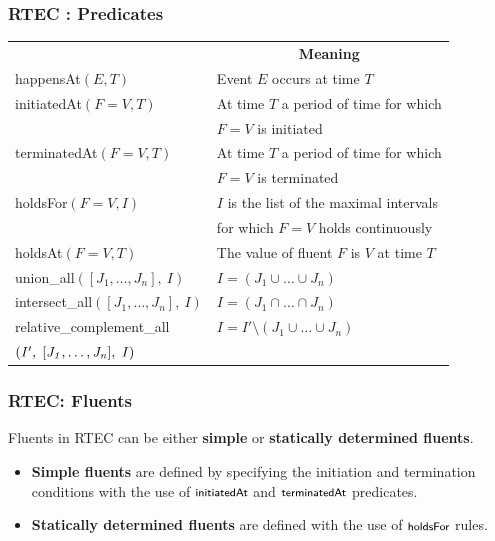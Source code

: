 \documentclass{beamer}
\def\happensAt{\textsf{\footnotesize happensAt}}
\def\holdsAt{\textsf{\footnotesize holdsAt}}
\def\holdsFor{\textsf{\footnotesize holdsFor}}
\def\initiatedAt{\textsf{\footnotesize initiatedAt}}
\def\terminatedAt{\textsf{\footnotesize terminatedAt}}
\def\unionall{\textsf{\footnotesize union\_all}}
\def\intersectall{\textsf{\footnotesize intersect\_all}}
\def\complementall{\textsf{\footnotesize relative\_complement\_all}}
\DeclareMathOperator{\val}{=}  %
\begin{document}
\begin{frame}
   \frametitle{RTEC : Predicates}
\begin{table}[t]
\scriptsize
\begin{center}
\renewcommand{\arraystretch}{0.9}
\setlength\tabcolsep{4.6pt}
\begin{tabular}{ll}
\hline\noalign{\smallskip}
\multicolumn{1}{c}{\textbf{Predicate}} & \multicolumn{1}{c}{\textbf{Meaning}}  \\
\noalign{\smallskip}
\hline
\noalign{\smallskip}
\happensAt$(E, T)$ & {\scriptsize Event $E$ occurs at time $T$}  \\[5pt]

\initiatedAt$(F \val V, T)$ & {\scriptsize At time $T$ a period of time for which}\\
								     & {\scriptsize $F\val V$ is initiated} \\[5pt]

\terminatedAt$(F \val V, T)$ & {\scriptsize At time $T$ a period of time for which} \\
									 & {\scriptsize $F\val V$ is terminated} \\[5pt]

\holdsFor$(F \val V, I)$ & {\scriptsize $I$ is the list of the maximal intervals} \\
                           					  & {\scriptsize for which $F\val V$ holds continuously} \\[5pt]

\holdsAt$(F \val V, T)$ & {\scriptsize The value of fluent $F$ is $V$ at time $T$} \\[5pt]

\unionall$\mathit{([J_1,\dots,J_n],\ I)}$ & $I\val (J_1\cup\ldots\cup J_n)$ \\[5pt]

\intersectall$\mathit{([J_1,\dots,J_n],\ I)}$ &  $I\val (J_1\cap\ldots\cap J_n)$\\[5pt]

\complementall &  $I\val I' \setminus (J_1\cup\ldots\cup J_n)$\\
$\mathit{\footnotesize (I',\ [J_1,\dots,J_n],\ I)}$ & \\
\hline
\end{tabular}
\end{center}
\end{table}
\end{frame}


\begin{frame}[fragile]
\frametitle{RTEC: Fluents}
Fluents in RTEC can be either \textbf{simple} or \textbf{statically determined fluents}.
\begin{itemize}
  
\item \textbf{Simple fluents} are defined by specifying the initiation and termination conditions with the use of $\mathit{\initiatedAt}$ and $\mathit{\terminatedAt}$ predicates. 
\item \textbf{Statically determined fluents} are defined with the use of $\mathit{\holdsFor}$ rules.

\end{itemize}
\end{frame}
\end{document}
